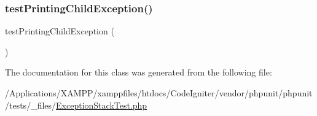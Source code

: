 \mbox{\label{class_exception_stack_test_ab3f5dbe6a82d8e030c57f085d5335647}} 
\subsubsection{\texorpdfstring{test\+Printing\+Child\+Exception()}{testPrintingChildException()}}
{\footnotesize\ttfamily test\+Printing\+Child\+Exception (\begin{DoxyParamCaption}{ }\end{DoxyParamCaption})}



The documentation for this class was generated from the following file\+:\begin{DoxyCompactItemize}
\item 
/\+Applications/\+X\+A\+M\+P\+P/xamppfiles/htdocs/\+Code\+Igniter/vendor/phpunit/phpunit/tests/\+\_\+files/\mbox{\hyperlink{_exception_stack_test_8php}{Exception\+Stack\+Test.\+php}}\end{DoxyCompactItemize}
